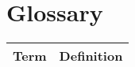 \section{Glossary}

\noindent
\begin{tabular}{lp{9cm}}
\toprule
\textbf{Term} & \textbf{Definition} \\
\midrule
\bottomrule
\end{tabular}
